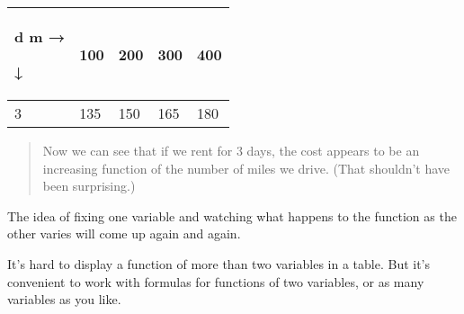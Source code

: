 \begin{longtable}[]{@{}lllll@{}}
\toprule
\begin{minipage}[b]{0.19\columnwidth}\raggedright\strut
d m →

↓\strut
\end{minipage} & \begin{minipage}[b]{0.19\columnwidth}\raggedright\strut
100\strut
\end{minipage} & \begin{minipage}[b]{0.19\columnwidth}\raggedright\strut
200\strut
\end{minipage} & \begin{minipage}[b]{0.19\columnwidth}\raggedright\strut
300\strut
\end{minipage} & \begin{minipage}[b]{0.19\columnwidth}\raggedright\strut
400\strut
\end{minipage}\tabularnewline
\midrule
\endhead
3 & 135 & 150 & 165 & 180\tabularnewline
\bottomrule
\end{longtable}

\begin{quote}
Now we can see that if we rent for 3 days, the cost appears to be an
increasing function of the number of miles we drive. (That shouldn't
have been surprising.)
\end{quote}

The idea of fixing one variable and watching what happens to the
function as the other varies will come up again and again.

It's hard to display a function of more than two variables in a table.
But it's convenient to work with formulas for functions of two
variables, or as many variables as you like.


